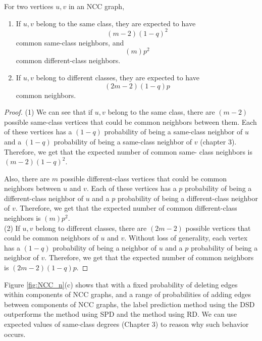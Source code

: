 \begin{proposition}
For two vertices $u,v$ in an NCC graph,
\begin{enumerate}[(1)]
\item If $u,v$ belong to the same class, they are expected to have 
$$(m-2)(1-q)^2$$ 
common same-class neighbors, and 
$$(m)p^2$$
common different-class neighbors.

\item If $u,v$ belong to different classes, they are expected to have 
$$(2m-2)(1-q)p$$
common neighbors.
\end{enumerate}
\end{proposition}

\begin{proof}
(1) We can see that if $u,v$ belong to the same class, there are $(m-2)$ 
possible same-class vertices that could be common neighbors between them. 
Each of these vertices has a $(1-q)$ probability of being a same-class 
neighbor of $u$ and a $(1-q)$ probability of being a same-class neighbor of 
$v$ (chapter 3). Therefore, we get that the expected number of common same-
class neighbors is $(m-2)(1-q)^2$.

Also, there are $m$ possible different-class vertices that could be common
neighbors between $u$ and $v$. Each of these vertices has a $p$ probability
of being a different-class neighbor of $u$ and a $p$ probability of being a
different-class neighbor of $v$. Therefore, we get that the expected number
of common different-class neighbors is $(m)p^2$.\\

\noindent
(2) If $u,v$ belong to different classes, there are $(2m-2)$ possible 
vertices that could be common neighbors of $u$ and $v$. Without loss of 
generality, each vertex has a $(1-q)$ probability of being a neighbor of $u$
and a $p$ probability of being a neighbor of $v$. Therefore, we get that the
expected number of common neighbors is $(2m-2)(1-q)p$.
\end{proof}

Figure \ref{fig:NCC_n}(c) shows that with a fixed probability of deleting
edges within components of NCC graphs, and a range of probabilities of
adding edges between components of NCC graphs, the label prediction method
using the DSD outperforms the method using SPD and the method using RD.
We can use expected values of same-class degrees (Chapter 3) to reason why
such behavior occurs.

